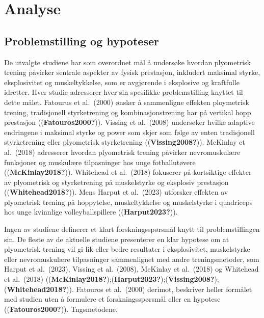 \documentclass[
  letterpaper,
  DIV=11,
  numbers=noendperiod]{scrreprt}
\begin{document}

\chapter{Analyse}\label{analyse}

\section{Problemstilling og
hypoteser}\label{problemstilling-og-hypoteser}

De utvalgte studiene har som overordnet mål å undersøke hvordan
plyometrisk trening påvirker sentrale aspekter av fysisk prestasjon,
inkludert maksimal styrke, eksplosivitet og muskeltykkelse, som er
avgjørende i eksplosive og kraftfulle idretter. Hver studie adresserer
hver sin spesifikke problemstilling knyttet til dette målet. Fatourus et
al.~(2000) ønsker å sammenligne effekten ploymetrisk trening,
tradisjonell styrketrening og kombinasjonstrening har på vertikal hopp
prestasjon ((\textbf{Fatouros2000?})). Vissing et al.~(2008) undersøker
hvilke adaptive endringene i maksimal styrke og power som skjer som
følge av enten tradisjonell styrketrening eller plyometrisk
styrketrening ((\textbf{Vissing2008?})). McKinlay et al.~(2018)
adresserer hvordan plyometrisk trening påvirker nevromuskulære
funksjoner og muskulære tilpasninger hos unge fotballutøvere
((\textbf{McKinlay2018?})). Whitehead et al.~(2018) fokuserer på
kortsiktige effekter av plyometrisk og styrketrening på muskelstyrke og
eksplosiv prestasjon ((\textbf{Whitehead2018?})). Mens Harput et
al.~(2023) utforsker effekten av plyometrisk trening på hoppytelse,
muskeltykkelse og muskelstyrke i quadriceps hos unge kvinnlige
volleyballspillere ((\textbf{Harput2023?})).

Ingen av studiene definerer et klart forskningsspørsmål knytt til
problemstillingen sin. De fleste av de aktuelle studiene presenterer en
klar hypotese om at plyometrisk trening vil gi lik eller bedre
resultater i eksplosivitet, muskelstyrke eller nevromuskulære
tilpasninger sammenlignet med andre treningsmetoder, som Harput et
al.~(2023), Vissing et al.~(2008), McKinlay et al.~(2018) og Whitehead
et al.~(2018)
((\textbf{McKinlay2018?});(\textbf{Harput2023?});(\textbf{Vissing2008?});(\textbf{Whitehead2018?})).
Fatouros et al.~(2000) derimot, beskriver heller formålet med studien
uten å formulere et forskningsspørsmål eller en hypotese
((\textbf{Fatouros2000?})). Tngsmetodene.
\end{document}
